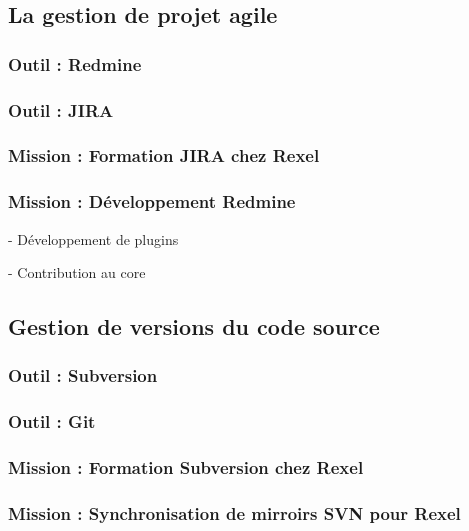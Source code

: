 \subsection{La gestion de projet agile}

\subsubsection{Outil : Redmine}

\subsubsection{Outil : JIRA}

\subsubsection{Mission : Formation JIRA chez Rexel}

\subsubsection{Mission : Développement Redmine}

- Développement de plugins

- Contribution au core



\subsection{Gestion de versions du code source}

\subsubsection{Outil : Subversion}

\subsubsection{Outil : Git}

\subsubsection{Mission : Formation Subversion chez Rexel}

\subsubsection{Mission : Synchronisation de mirroirs SVN pour Rexel}

